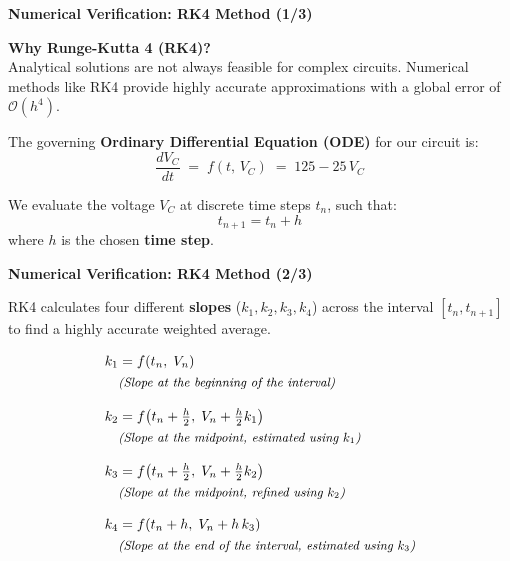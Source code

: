 \documentclass[12pt]{beamer}
\begin{document}
\begin{frame}{\textbf{Numerical Verification: RK4 Method (1/3)}}
  \begin{center}
    \vfill
    \textbf{Why Runge-Kutta 4 (RK4)?}\\
    Analytical solutions are not always feasible for complex circuits. Numerical methods like RK4 provide highly accurate approximations with a global error of $\mathcal{O}(h^4)$.

    \vspace{1.5em}
    The governing \textbf{Ordinary Differential Equation (ODE)} for our circuit is:
    \[
      \frac{dV_C}{dt} \;=\; f(t,\,V_C) \;=\; 125 - 25\,V_C
    \]

    \vspace{1em}
    We evaluate the voltage $V_C$ at discrete time steps $t_n$, such that:
    \[
      t_{n+1} = t_n + h
    \]
    where $h$ is the chosen \textbf{time step}.
    \vfill
  \end{center}
\end{frame}

\begin{frame}{\textbf{Numerical Verification: RK4 Method (2/3)}}
  \begin{center}
    \vfill
    RK4 calculates four different \textbf{slopes} ($k_1, k_2, k_3, k_4$) across the interval $[t_n, t_{n+1}]$ to find a highly accurate weighted average.

    \vspace{1em}
    \begin{align*}
      k_1 &= f(t_n,\;V_n) \\
      &\small\textit{(Slope at the beginning of the interval)} \\[0.8em]
      k_2 &= f\!\left(t_n+\tfrac{h}{2},\;V_n+\tfrac{h}{2}k_1\right) \\
      &\small\textit{(Slope at the midpoint, estimated using $k_1$)} \\[0.8em]
      k_3 &= f\!\left(t_n+\tfrac{h}{2},\;V_n+\tfrac{h}{2}k_2\right) \\
      &\small\textit{(Slope at the midpoint, refined using $k_2$)} \\[0.8em]
      k_4 &= f(t_n+h,\;V_n+h\,k_3) \\
      &\small\textit{(Slope at the end of the interval, estimated using $k_3$)}
    \end{align*}
    \vfill
  \end{center}
\end{frame}
\end{document}
